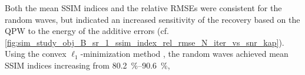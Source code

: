Both
the mean \ac{SSIM} indices and
the relative \acp{RMSE} were consistent for
the random waves, but indicated
an increased sensitivity of
the recovery based on
the \ac{QPW} to
the energy of
the additive errors
(cf. \cref{fig:sim_study_obj_B_sr_1_ssim_index_rel_rmse_N_iter_vs_snr_kap}).
Using
the convex $\ell_{1}$-minimization method
,
the random waves achieved
%
mean \ac{SSIM} indices increasing from
\SIrange{80.2}{90.6}{\percent},
